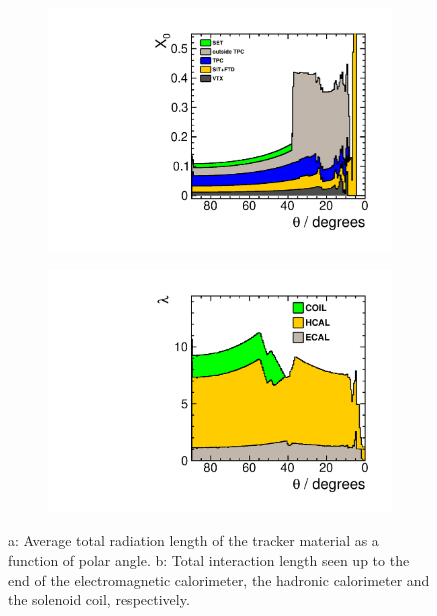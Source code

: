 \begin{figure}[th!]

\begin{subfigure}{0.45\textwidth}
\includegraphics[width=\textwidth]{Modelling/fig/ILD_l5_v02_matbudget_tracker_85deg.pdf}
 \caption{ \label{fig:det:material:x0}}
\end{subfigure}
\begin{subfigure}{0.45\textwidth}
\includegraphics[width=\textwidth]{Modelling/fig/ILD_l5_v02_matbudget_calo_85deg.pdf}
 \caption{ \label{fig:det:material:lambda}}
\end{subfigure}
\caption[\label{fig:det:material} Material in the ILD detector]{a: Average total radiation length of the tracker material as a function of polar angle. b: Total interaction length seen up to the end of the electromagnetic calorimeter, the hadronic calorimeter and the solenoid coil, respectively.}
\end{figure}

